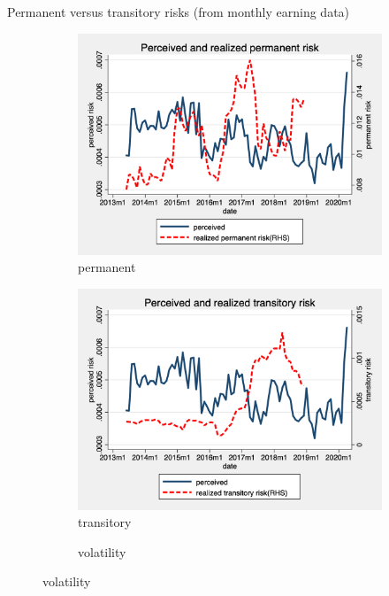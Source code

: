 \documentclass{beamer}
\begin{document}
\begin{frame}{Permanent versus transitory risks (from monthly earning data)}
	\label{monthly_decomposition_compare}
	\begin{figure}[ht]
		\centering
		\begin{subfigure}[b]{0.32\textwidth}
			\caption{permanent}
			\includegraphics[width=\textwidth]{figures/real_permanent_compare.png}
		\end{subfigure}
		\begin{subfigure}[b]{0.32\textwidth}
			\caption{transitory}
			\includegraphics[width=\textwidth]{figures/real_transitory_compare.png}
		\end{subfigure} 
		\begin{subfigure}[b]{0.32\textwidth}
		\caption{volatility}

\end{subfigure}
\end{figure}
\end{frame}
\end{document}
